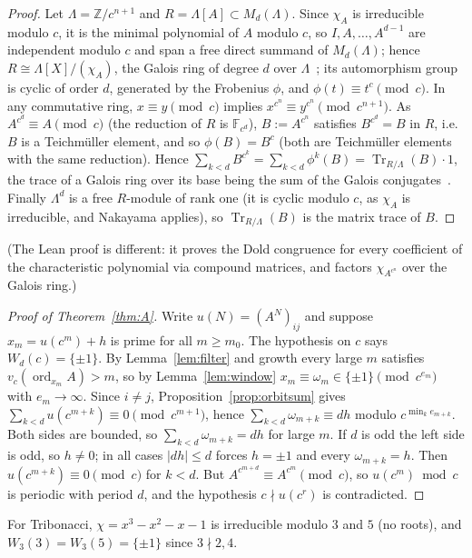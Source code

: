 \documentclass[11pt]{amsart}
\theoremstyle{definition}
\newcommand{\Z}{\mathbb{Z}}
\newcommand{\F}{\mathbb{F}}
\newcommand{\Tr}{\operatorname{Tr}}
\newcommand{\ord}{\operatorname{ord}}
\begin{document}
\begin{proof}
Let $\Lambda=\Z/c^{n+1}$ and $R=\Lambda[A]\subset M_d(\Lambda)$.  Since $\chi_A$ is irreducible modulo $c$, it is the minimal polynomial of $A$ modulo $c$, so $I,A,\dots,A^{d-1}$ are independent modulo $c$ and span a free direct summand of $M_d(\Lambda)$; hence $R\cong\Lambda[X]/(\chi_A)$, the Galois ring of degree $d$ over $\Lambda$~\cite{Wan03}; its automorphism group is cyclic of order $d$, generated by the Frobenius $\phi$, and $\phi(t)\equiv t^c\pmod c$.  In any commutative ring, $x\equiv y\pmod c$ implies $x^{c^n}\equiv y^{c^n}\pmod{c^{n+1}}$.  As $A^{c^d}\equiv A\pmod c$ (the reduction of $R$ is $\F_{c^d}$), $B:=A^{c^n}$ satisfies $B^{c^d}=B$ in $R$, i.e.\ $B$ is a Teichm\"uller element, and so $\phi(B)=B^c$ (both are Teichm\"uller elements with the same reduction).  Hence $\sum_{k<d}B^{c^k}=\sum_{k<d}\phi^k(B)=\Tr_{R/\Lambda}(B)\cdot1$, the trace of a Galois ring over its base being the sum of the Galois conjugates~\cite{Wan03}.  Finally $\Lambda^d$ is a free $R$-module of rank one (it is cyclic modulo $c$, as $\chi_A$ is irreducible, and Nakayama applies), so $\Tr_{R/\Lambda}(B)$ is the matrix trace of $B$.
\end{proof}

(The Lean proof is different: it proves the Dold congruence for every coefficient of the characteristic polynomial via compound matrices, and factors $\chi_{A^{c^n}}$ over the Galois ring.)

\begin{proof}[Proof of Theorem~\ref{thm:A}]
Write $u(N)=(A^N)_{ij}$ and suppose $x_m=u(c^m)+h$ is prime for all $m\ge m_0$.  The hypothesis on $c$ says $W_d(c)=\{\pm1\}$.  By Lemma~\ref{lem:filter} and growth every large $m$ satisfies $v_c(\ord_{x_m}A)>m$, so by Lemma~\ref{lem:window} $x_m\equiv\omega_m\in\{\pm1\}\pmod{c^{e_m}}$ with $e_m\to\infty$.  Since $i\neq j$, Proposition~\ref{prop:orbitsum} gives $\sum_{k<d}u(c^{m+k})\equiv0\pmod{c^{m+1}}$, hence $\sum_{k<d}\omega_{m+k}\equiv dh$ modulo $c^{\min_k e_{m+k}}$.  Both sides are bounded, so $\sum_{k<d}\omega_{m+k}=dh$ for large $m$.  If $d$ is odd the left side is odd, so $h\neq0$; in all cases $|dh|\le d$ forces $h=\pm1$ and every $\omega_{m+k}=h$.  Then $u(c^{m+k})\equiv0\pmod c$ for $k<d$.  But $A^{c^{m+d}}\equiv A^{c^m}\pmod c$, so $u(c^m)\bmod c$ is periodic with period $d$, and the hypothesis $c\nmid u(c^r)$ is contradicted.
\end{proof}

For Tribonacci, $\chi=x^3-x^2-x-1$ is irreducible modulo $3$ and $5$ (no roots), and $W_3(3)=W_3(5)=\{\pm1\}$ since $3\nmid 2,4$.
\end{document}
